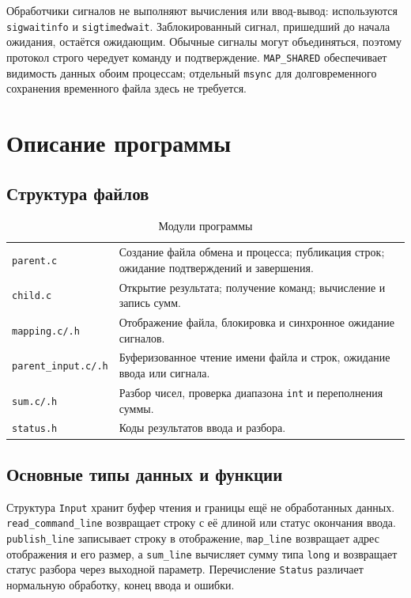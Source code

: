 \documentclass[12pt,a4paper]{article}
\begin{document}
Обработчики сигналов не выполняют вычисления или ввод-вывод: используются \texttt{sigwaitinfo} и \texttt{sigtimedwait}. Заблокированный сигнал, пришедший до начала ожидания, остаётся ожидающим. Обычные сигналы могут объединяться, поэтому протокол строго чередует команду и подтверждение. \texttt{MAP\_SHARED} обеспечивает видимость данных обоим процессам; отдельный \texttt{msync} для долговременного сохранения временного файла здесь не требуется.

\section{Описание программы}
\subsection{Структура файлов}
\begin{table}[H]
\caption{Модули программы}
\small
\begin{tabularx}{\linewidth}{|P{3.4cm}|L|}
\hline
{} & \\ \hline
\texttt{parent.c} & Создание файла обмена и процесса; публикация строк; ожидание подтверждений и завершения.\\ \hline
\texttt{child.c} & Открытие результата; получение команд; вычисление и запись сумм.\\ \hline
\texttt{mapping.c/.h} & Отображение файла, блокировка и синхронное ожидание сигналов.\\ \hline
\texttt{parent\_input.c/.h} & Буферизованное чтение имени файла и строк, ожидание ввода или сигнала.\\ \hline
\texttt{sum.c/.h} & Разбор чисел, проверка диапазона \texttt{int} и переполнения суммы.\\ \hline
\texttt{status.h} & Коды результатов ввода и разбора.\\ \hline
\end{tabularx}
\end{table}

\subsection{Основные типы данных и функции}

Структура \texttt{Input} хранит буфер чтения и границы ещё не обработанных данных. \texttt{read\_command\_line} возвращает строку с её длиной или статус окончания ввода. \texttt{publish\_line} записывает строку в отображение, \texttt{map\_line} возвращает адрес отображения и его размер, а \texttt{sum\_line} вычисляет сумму типа \texttt{long} и возвращает статус разбора через выходной параметр. Перечисление \texttt{Status} различает нормальную обработку, конец ввода и ошибки.
\end{document}
